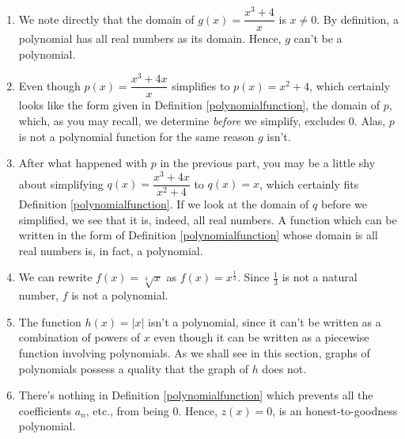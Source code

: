 {
\begin{enumerate}

\item  We note directly that the domain of $g(x) = \dfrac{x^3+4}{x}$ is $x \neq 0$.  By definition, a polynomial has all real numbers as its domain.  Hence, $g$ can't be a polynomial.

\item  Even though $p(x) = \dfrac{x^3+4x}{x}$ simplifies to $p(x) = x^2+4$, which certainly looks like the form given in Definition \ref{polynomialfunction}, the domain of $p$, which, as you may recall, we determine \emph{before} we simplify, excludes $0$.  Alas, $p$ is not a polynomial function for the same reason $g$ isn't.

\item  After what happened with $p$ in the previous part, you may be a little shy about simplifying $q(x) = \dfrac{x^3+4x}{x^2+4}$ to $q(x) = x$, which certainly fits Definition \ref{polynomialfunction}.  If we look at the domain of $q$ before we simplified, we see that it is, indeed, all real numbers.  A function which can be written in the form of Definition \ref{polynomialfunction} whose domain is all real numbers is, in fact, a polynomial.  

\item  We can rewrite $f(x) =\sqrt[3]{x}$ as $f(x) = x^{\frac{1}{3}}$.  Since $\frac{1}{3}$ is not a natural number, $f$ is not a polynomial.

\item  The function $h(x) = |x|$ isn't a polynomial, since it can't be written as a combination of powers of $x$ even though it can be written as a piecewise function involving polynomials.  As we shall see in this section, graphs of polynomials possess a quality that the graph of $h$ does not.  


\item  There's nothing in Definition \ref{polynomialfunction} which prevents all the coefficients $a_{n}$, etc., from being $0$.  Hence, $z(x) = 0$, is an honest-to-goodness polynomial.

\end{enumerate}
}


\medskip


